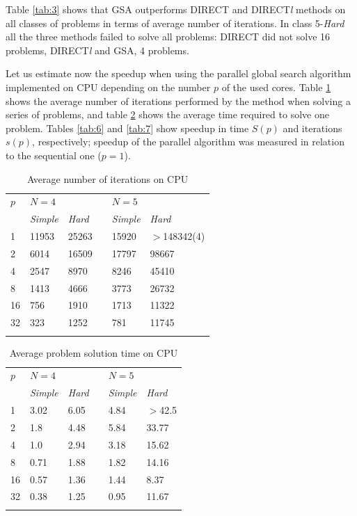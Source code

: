 \documentclass[smallcondensed]{svjour3}     %
\begin{document}
Table \ref{tab:3} shows that GSA outperforms DIRECT and DIRECT\textit{l} methods on all classes of problems in terms of average number of iterations. In class 5-\textit{Hard} all the three methods failed to solve all problems: DIRECT did not solve 16 problems, DIRECT\textit{l} and GSA, 4 problems.

Let us estimate now the speedup when using the parallel global search algorithm implemented on CPU depending on the number $p$ of the used cores. Table \ref{tab:4} shows the average number of iterations performed by the method when solving a series of problems, and table \ref{tab:5} shows the average time required to solve one problem. Tables \ref{tab:6} and \ref{tab:7} show speedup in time $S(p)$ and iterations $s(p)$, respectively; speedup of the parallel algorithm was measured in relation to the sequential one ($p=1$).

\begin{table}
	\caption{Average number of iterations on CPU}
	\label{tab:4}
	\center
	\begin{tabular}{llllll}
		\hline\noalign{\smallskip}
		$p$ & \multicolumn{2}{l}{ $N=4$ } & & \multicolumn{2}{l}{$N=5$} \\
		\noalign{\smallskip} \cline{2-3} \cline{5-6} \noalign{\smallskip}
		 & \textit{Simple} & \textit{Hard} & & \textit{Simple} & \textit{Hard}  \\
		\noalign{\smallskip} \hline \noalign{\smallskip}
		1 &	11953 &	25263 & &	15920 &	$>$148342(4) \\
		2 &	6014 &	16509 & & 17797 &	98667 \\
		4 &	2547 &	8970 & &	8246 &	45410 \\
		8 &	1413 &	4666 & &	3773 &	26732 \\
		16 &	756 &	1910 & &	1713 &	11322 \\
		32 &	323 &	1252 & &	781 &	11745 \\
		\noalign{\smallskip}\hline
	\end{tabular}
\end{table}

\begin{table}
	\caption{Average problem solution time on CPU}
	\label{tab:5}
	\center
	\begin{tabular}{llllll}
		\hline\noalign{\smallskip}
		$p$ & \multicolumn{2}{l}{ $N=4$ } & & \multicolumn{2}{l}{$N=5$} \\
		\noalign{\smallskip} \cline{2-3} \cline{5-6} \noalign{\smallskip}
		 & \textit{Simple} & \textit{Hard} & & \textit{Simple} & \textit{Hard}  \\
		\noalign{\smallskip} \hline \noalign{\smallskip}
		1 &	3.02 &	6.05 & &	4.84 &	$>$42.5 \\
		2 &	1.8 &	4.48 & &	5.84 &	33.77 \\
		4 &	1.0 &	2.94 & &	3.18 &	15.62 \\
		8 &	0.71 &	1.88 & &	1.82 &	14.16 \\
		16 &	0.57 &	1.36 & &	1.44 &	8.37 \\
		32 &	0.38 &	1.25 & &	0.95 &	11.67 \\
		\noalign{\smallskip}\hline
	\end{tabular}
\end{table}
\end{document}
